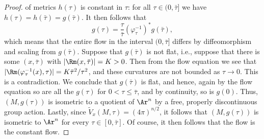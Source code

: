 \begin{proof}
of metrics $h(\tau)$ is  constant in $\tau$: for all $\tau\in
(0,\bar\tau]$ we have $h(\tau)=h(\bar\tau)=g(\bar\tau)$. It then
follows that
$$g(\tau)=\frac{\tau}{\bar\tau}(\varphi_\tau^{-1})^*g(\bar\tau),$$
which means that the entire flow in the interval $(0,\bar\tau]$
differs by diffeomorphism and scaling from $g(\bar\tau)$. Suppose
that $g(\bar\tau)$ is not flat, i.e., suppose that there is some
$(x,\bar\tau)$ with $|\Rm(x,\bar\tau)|=K>0$. Then from the flow
equation we see that $|\Rm(\varphi^{-1}_\tau(x),\tau)|=K\bar\tau^2/\tau^2$, and these
curvatures are not bounded as $\tau\rightarrow 0$. This is a
contradiction. We conclude that $g(\bar\tau)$ is flat, and hence,
again by the flow equation so are all the $g(\tau)$ for $0<\tau\le
\bar\tau$, and by continuity, so is $g(0)$. Thus, $(M,g(\tau))$ is
isometric to a quotient of $\Ar^n$ by a free, properly discontinuous
group action. Lastly, since $\widetilde V_x(M,\tau)=(4\pi)^{n/2}$,
it follows that $(M,g(\tau))$ is isometric to $\Ar^n$ for every
$\tau\in [0,\bar\tau]$. Of course, it then follows that the flow is
the constant flow.
\end{proof}
